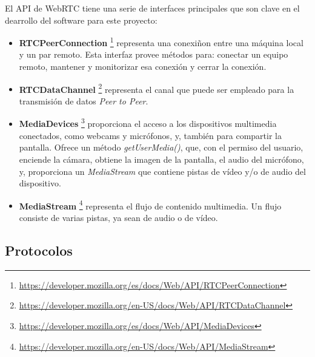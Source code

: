 \documentclass[a4paper, 12pt]{book}
\begin{document}
El API de WebRTC tiene una serie de interfaces principales que son clave en el dearrollo del software para este proyecto:

\begin{itemize}
\item \textbf{RTCPeerConnection} \footnote{\url{https://developer.mozilla.org/es/docs/Web/API/RTCPeerConnection}} representa una conexiñon entre una máquina local y un par remoto. Esta interfaz provee métodos para: conectar un equipo remoto, mantener y monitorizar esa conexión y cerrar la conexión.

\item \textbf{RTCDataChannel} \footnote{\url{https://developer.mozilla.org/en-US/docs/Web/API/RTCDataChannel}} representa el canal que puede ser empleado para la transmisión de datos \textit{Peer to Peer}.

\item \textbf{MediaDevices} \footnote{\url{https://developer.mozilla.org/es/docs/Web/API/MediaDevices}} proporciona el acceso a los dispositivos multimedia conectados, como webcams y micrófonos, y, también para compartir la pantalla. Ofrece un método \textit{getUserMedia()}, que, con el permiso del usuario, enciende la cámara, obtiene la imagen de la pantalla, el audio del micrófono, y, proporciona un \textit{MediaStream} que contiene pistas de vídeo y/o de audio del dispositivo.

\item \textbf{MediaStream} \footnote{\url{https://developer.mozilla.org/en-US/docs/Web/API/MediaStream}} representa el flujo de contenido multimedia. Un flujo consiste de varias pistas, ya sean de audio o de vídeo.
\end{itemize}

\subsection{Protocolos}
\label{subsec:protocolos}
\end{document}
